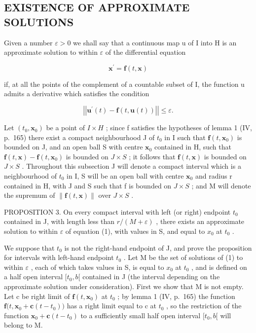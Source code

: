 \subsection{EXISTENCE OF APPROXIMATE SOLUTIONS}

Given a number \(\varepsilon > 0\) we shall say that a continuous map u of I into H is an approximate solution to within \(\varepsilon\) of the differential equation

\[
\mathbf {x} ^ {\prime} = \mathbf {f} (t, \mathbf {x})\tag{1}
\]

if, at all the points of the complement of a countable subset of I, the function u admits a derivative which satisfies the condition

\[
\left| \left| \mathbf {u} ^ {\prime} (t) - \mathbf {f} (t, \mathbf {u} (t)) \right| \right| \leqslant \varepsilon .\tag{7}
\]

Let \((t_{0}, \mathbf{x}_{0})\) be a point of \(I \times H\) ; since f satisfies the hypotheses of lemma 1 (IV, p.~165) there exist a compact neighbourhood J of \(t_{0}\) in I such that \(\mathbf{f}(t, \mathbf{x}_{0})\) is bounded on J, and an open ball S with centre \(\mathbf{x}_{0}\) contained in H, such that \(\mathbf{f}(t, \mathbf{x}) - \mathbf{f}(t, \mathbf{x}_{0})\) is bounded on \(J \times S\) ; it follows that \(\mathbf{f}(t, \mathbf{x})\) is bounded on \(J \times S\) . Throughout this subsection J will denote a compact interval which is a neighbourhood of \(t_{0}\) in I, S will be an open ball with centre \(\mathbf{x}_{0}\) and radius r contained in H, with J and S such that f is bounded on \(J \times S\) ; and M will denote the supremum of \(\| \mathbf{f}(t, \mathbf{x}) \|\) over \(J \times S\) .

PROPOSITION 3. On every compact interval with left (or right) endpoint \(t_{0}\) contained in J, with length less than \(r/(M + \varepsilon)\) , there exists an approximate solution to within \(\varepsilon\) of equation (1), with values in S, and equal to \(x_{0}\) at \(t_{0}\) .

We suppose that \(t_{0}\) is not the right-hand endpoint of J, and prove the proposition for intervals with left-hand endpoint \(t_{0}\) . Let M be the set of solutions of (1) to within \(\varepsilon\) , each of which takes values in S, is equal to \(x_{0}\) at \(t_{0}\) , and is defined on a half open interval \([t_{0}, b[\) contained in J (the interval depending on the approximate solution under consideration). First we show that M is not empty. Let c be right limit of \(\mathbf{f}(t, \mathbf{x}_{0})\) at \(t_{0}\) ; by lemma 1 (IV, p.~165) the function \(\mathbf{f}\big(t, \mathbf{x}_{0} + \mathbf{c}(t - t_{0})\big)\) has a right limit equal to c at \(t_{0}\) , so the restriction of the function \(\mathbf{x}_{0} + \mathbf{c}(t - t_{0})\) to a sufficiently small half open interval \([t_{0}, b[\) will belong to M.

